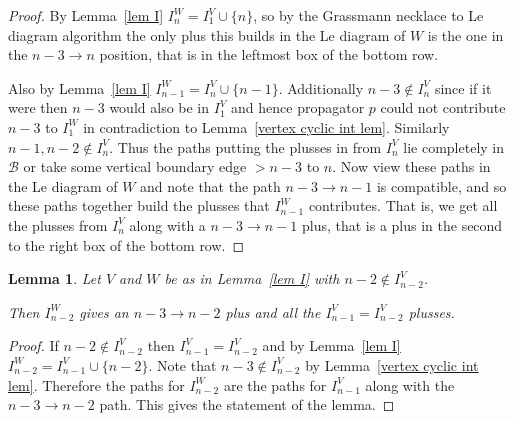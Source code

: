 \documentclass[11pt]{article}
\newtheorem{lem}[thm]{Lemma}
\theoremstyle{remark}
\theoremstyle{definition}
\begin{document}
\begin{proof}
  By Lemma~\ref{lem I} $I_n^{W}= I_1^{V} \cup \{n\}$, so by the Grassmann necklace to Le diagram algorithm the only plus this builds in the Le diagram of $W$ is  the one in the $n-3\rightarrow n$ position, that is in the leftmost box of the bottom row.

  Also by Lemma~\ref{lem I} $I_{n-1}^{W} = I_n^{V} \cup \{n-1\}$.  Additionally $n-3\not\in I_{n}^{V}$ since if it were then $n-3$ would also be in $I_1^{V}$ and hence propagator $p$ could not contribute $n-3$ to $I_1^{W}$ in contradiction to Lemma~\ref{vertex cyclic int lem}.  Similarly $n-1, n-2\not\in I_n^{V}$.  Thus the paths putting the plusses in from $I_n^{V}$ lie completely in $\mathcal{B}$ or take some vertical boundary edge $>n-3$ to $n$.   Now view these paths in the Le diagram of $W$ and note that the path $n-3\rightarrow n-1$ is compatible, and so these paths together build the plusses that $I_{n-1}^{W}$ contributes.  That is, we get all the plusses from $I_{n}^{V}$ along with a $n-3\rightarrow n-1$ plus, that is a plus in the second to the right box of the bottom row.
\end{proof}

\begin{lem}\label{lem n-2 good}
  Let $V$ and $W$ be as in Lemma~\ref{lem I} with $n-2 \not\in I_{n-2}^{V}$.

  Then $I_{n-2}^{W}$ gives
  an $n-3\rightarrow n-2$ plus and
  all the $I_{n-1}^{V}=I_{n-2}^{V}$ plusses.
\end{lem}

\begin{proof}
  If $n-2\not\in I_{n-2}^{V}$ then $I_{n-1}^{V}=I_{n-2}^{V}$ and by Lemma~\ref{lem I} $I_{n-2}^{W} = I_{n-1}^{V} \cup \{n-2\}$.  Note that $n-3\not\in I_{n-2}^{V}$ by Lemma~\ref{vertex cyclic int lem}.  Therefore the paths for $I_{n-2}^{W}$ are the paths for $I_{n-1}^{V}$ along with the $n-3\rightarrow n-2$ path.  This gives the statement of the lemma.

\end{proof}
\end{document}
